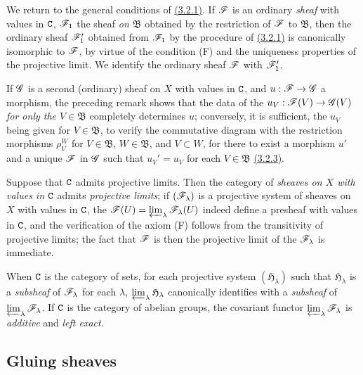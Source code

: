 \begin{env}[3.2.5]
\label{0.3.2.5}
We return to the general conditions of \hyperref[0.3.2.1]{(3.2.1)}. If $\mathscr{F}$ is an
ordinary {\em sheaf} with values in $\mathtt{C}$, $\mathscr{F}_1$ the sheaf {\em on
$\mathfrak{B}$} obtained by the restriction of $\mathscr{F}$ to $\mathfrak{B}$, then
the ordinary sheaf $\mathscr{F}_1'$ obtained from $\mathscr{F}_1$ by the procedure of
\hyperref[0.3.2.1]{(3.2.1)} is canonically isomorphic to $\mathscr{F}$, by virtue of the
condition (F) and the uniqueness properties of the projective limit. We identify
the ordinary sheaf $\mathscr{F}$ with $\mathscr{F}_1'$.

If $\mathscr{G}$ is a second (ordinary) sheaf on $X$ with values in $\mathtt{C}$, and
$u:\mathscr{F}\to\mathscr{G}$ a morphism, the preceding remark shows that the data of the
$u_V:\mathscr{F}(V)\to\mathscr{G}(V)$ {\em for only the $V\in\mathfrak{B}$} completely
determines $u$; conversely, it is sufficient, the $u_V$ being given for
$V\in\mathfrak{B}$, to verify the commutative diagram with the restriction
morphisms $\rho_V^W$ for $V\in\mathfrak{B}$, $W\in\mathfrak{B}$, and
$V\subset W$, for there to exist a morphism $u'$ and a unique $\mathscr{F}$ in
$\mathscr{G}$ such that $u_V'=u_V$ for each $V\in\mathfrak{B}$ \hyperref[0.3.2.3]{(3.2.3)}.
\end{env}

\begin{env}[3.2.6]
\label{0.3.2.6}
Suppose that $\mathtt{C}$ admits projective limits. Then the category of {\em sheaves
on $X$ with values in $\mathtt{C}$} admits {\em projective limits}; if
$(\mathscr{F}_\lambda)$ is a projective system of sheaves on $X$ with values in $\mathtt{C}$,
the $\mathscr{F}(U)=\varprojlim_\lambda\mathscr{F}_\lambda(U)$ indeed define a presheaf
with values in $\mathtt{C}$, and the verification of the axiom (F) follows from the
transitivity of projective limits; the fact that $\mathscr{F}$ is then the projective
limit of the $\mathscr{F}_\lambda$ is immediate.

When $\mathtt{C}$ is the category of sets, for each projective system
$(\mathfrak{H}_\lambda)$ such
that $\mathfrak{H}_\lambda$ is a {\em subsheaf} of $\mathscr{F}_\lambda$ for each
$\lambda$, $\varprojlim_\lambda\mathfrak{H}_\lambda$ canonically identifies with
a {\em subsheaf} of $\varprojlim_\lambda\mathscr{F}_\lambda$. If $\mathtt{C}$ is the
category of abelian groups, the covariant functor
$\varprojlim_\lambda\mathscr{F}_\lambda$ is {\em additive} and {\em left exact}.
\end{env}

\subsection{Gluing sheaves}
\label{subsection-gluing-sheaves}

